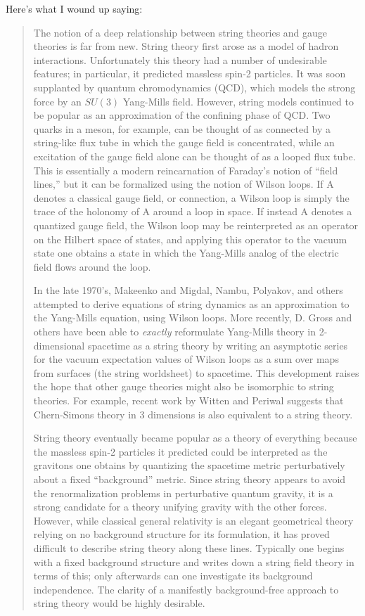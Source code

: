 \documentclass{article}
\begin{document}
Here's what I wound up saying:

\begin{quote}
The notion of a deep relationship between string theories and gauge
theories is far from new. String theory first arose as a model of hadron
interactions. Unfortunately this theory had a number of undesirable
features; in particular, it predicted massless spin-2 particles. It was
soon supplanted by quantum chromodynamics (QCD), which models the strong
force by an \(SU(3)\) Yang-Mills field. However, string models continued
to be popular as an approximation of the confining phase of QCD. Two
quarks in a meson, for example, can be thought of as connected by a
string-like flux tube in which the gauge field is concentrated, while an
excitation of the gauge field alone can be thought of as a looped flux
tube. This is essentially a modern reincarnation of Faraday's notion of
``field lines,'' but it can be formalized using the notion of Wilson
loops. If A denotes a classical gauge field, or connection, a Wilson
loop is simply the trace of the holonomy of A around a loop in space. If
instead A denotes a quantized gauge field, the Wilson loop may be
reinterpreted as an operator on the Hilbert space of states, and
applying this operator to the vacuum state one obtains a state in which
the Yang-Mills analog of the electric field flows around the loop.

In the late 1970's, Makeenko and Migdal, Nambu, Polyakov, and others
attempted to derive equations of string dynamics as an approximation to
the Yang-Mills equation, using Wilson loops. More recently, D. Gross and
others have been able to \emph{exactly} reformulate Yang-Mills theory in
2-dimensional spacetime as a string theory by writing an asymptotic
series for the vacuum expectation values of Wilson loops as a sum over
maps from surfaces (the string worldsheet) to spacetime. This
development raises the hope that other gauge theories might also be
isomorphic to string theories. For example, recent work by Witten and
Periwal suggests that Chern-Simons theory in 3 dimensions is also
equivalent to a string theory.

String theory eventually became popular as a theory of everything
because the massless spin-2 particles it predicted could be interpreted
as the gravitons one obtains by quantizing the spacetime metric
perturbatively about a fixed ``background'' metric. Since string theory
appears to avoid the renormalization problems in perturbative quantum
gravity, it is a strong candidate for a theory unifying gravity with the
other forces. However, while classical general relativity is an elegant
geometrical theory relying on no background structure for its
formulation, it has proved difficult to describe string theory along
these lines. Typically one begins with a fixed background structure and
writes down a string field theory in terms of this; only afterwards can
one investigate its background independence. The clarity of a manifestly
background-free approach to string theory would be highly desirable.


\end{quote}
\end{document}
